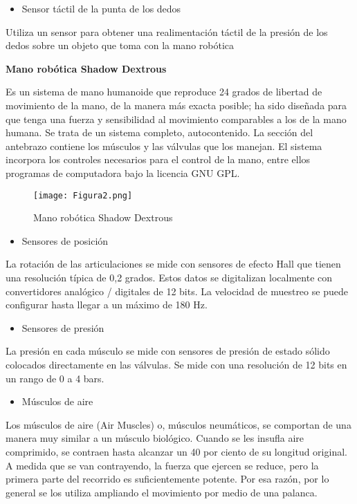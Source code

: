 \documentclass{article}
\begin{document}
\begin{itemize}
\item Sensor táctil de la punta de los dedos
\end{itemize}
Utiliza un sensor para obtener una realimentación táctil de la presión de los dedos sobre un objeto que toma con la mano robótica

\textbf{Mano robótica Shadow Dextrous}

Es un sistema de mano humanoide que reproduce 24 grados de libertad de movimiento de la mano, de la manera más exacta posible; ha sido diseñada para que tenga una fuerza y sensibilidad al movimiento comparables a los de la mano humana.
Se trata de un sistema completo, autocontenido. La sección del antebrazo contiene los músculos y las válvulas que los manejan. El sistema incorpora los controles necesarios para el control de la mano, entre ellos programas de computadora bajo la licencia GNU GPL.

\begin{figure} [htp]%
    \centering
    \texttt{[image: Figura2.png]} %
    \caption{Mano robótica Shadow Dextrous}
    \label{grafica}
\end{figure}

\begin{itemize}
\item Sensores de posición
\end{itemize}
La rotación de las articulaciones se mide con sensores de efecto Hall que tienen una resolución típica de 0,2 grados. Estos datos se digitalizan localmente con convertidores analógico / digitales de 12 bits. La velocidad de muestreo se puede configurar hasta llegar a un máximo de 180 Hz.

\begin{itemize}
\item Sensores de presión
\end{itemize}
La presión en cada músculo se mide con sensores de presión de estado sólido colocados directamente en las válvulas. Se mide con una resolución de 12 bits en un rango de 0 a 4 bars.

\begin{itemize}
\item Músculos de aire
\end{itemize}
Los músculos de aire (Air Muscles) o, músculos neumáticos, se comportan de una manera muy similar a un músculo biológico. Cuando se les insufla aire comprimido, se contraen hasta alcanzar un 40 por ciento de su longitud original. A medida que se van contrayendo, la fuerza que ejercen se reduce, pero la primera parte del recorrido es suficientemente potente. Por esa razón, por lo general se los utiliza ampliando el movimiento por medio de una palanca.
\end{document}

